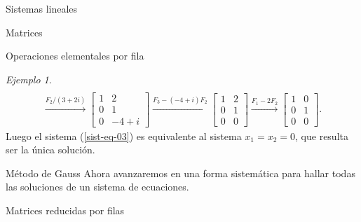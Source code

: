 \documentclass[a4paper,12pt,twoside,spanish,reqno]{amsbook}
\numberwithin{equation}{section}
\theoremstyle{definition}
\theoremstyle{remark}
\newtheorem*{ejemplo*}{Ejemplo}
\begin{document}
\begin{chapter}{Sistemas lineales}
\begin{section}{Matrices}
\begin{subsection}{Operaciones elementales por fila}
\begin{ejemplo*}
\begin{multline*}
                    \\
                    \stackrel{F_2/(3+2i)}{\longrightarrow} 
                    \begin{bmatrix} 1&2 \\ 0&1 \\ 0&-4+i \end{bmatrix}
                    \stackrel{F_3-(-4+i)F_2}{\longrightarrow} 
                    \begin{bmatrix} 1&2 \\ 0&1 \\ 0&0 \end{bmatrix}
                    \stackrel{F_1-2F_2}{\longrightarrow} 
                    \begin{bmatrix} 1&0 \\ 0&1 \\ 0&0 \end{bmatrix}.
                    \end{multline*}
                    Luego  el sistema (\ref{sist-eq-03}) es equivalente al sistema  $x_1=x_2 = 0$, que resulta ser la única solución.
                \end{ejemplo*}
            \end{subsection} 
        


        
        \end{section}
    
    
    
            \begin{section}{Método de Gauss }\label{seccion-metodo-de-gauss} Ahora avanzaremos en una forma sistemática para hallar todas las soluciones de un sistema de ecuaciones.
    
            
            \begin{subsection}{Matrices reducidas por filas} 
                

\end{subsection}
\end{section}
\end{chapter}
\end{document}
